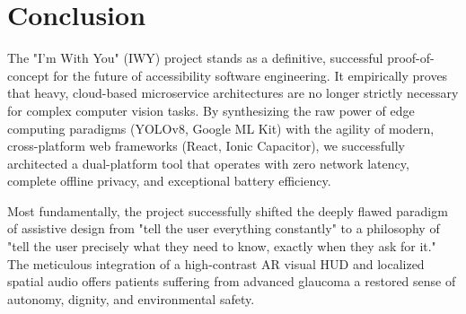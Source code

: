 \documentclass[12pt, a4paper]{report}
\begin{document}
\section{Conclusion}
The "I'm With You" (IWY) project stands as a definitive, successful proof-of-concept for the future of accessibility software engineering. It empirically proves that heavy, cloud-based microservice architectures are no longer strictly necessary for complex computer vision tasks. By synthesizing the raw power of edge computing paradigms (YOLOv8, Google ML Kit) with the agility of modern, cross-platform web frameworks (React, Ionic Capacitor), we successfully architected a dual-platform tool that operates with zero network latency, complete offline privacy, and exceptional battery efficiency.

Most fundamentally, the project successfully shifted the deeply flawed paradigm of assistive design from "tell the user everything constantly" to a philosophy of "tell the user precisely what they need to know, exactly when they ask for it." The meticulous integration of a high-contrast AR visual HUD and localized spatial audio offers patients suffering from advanced glaucoma a restored sense of autonomy, dignity, and environmental safety.
\end{document}
